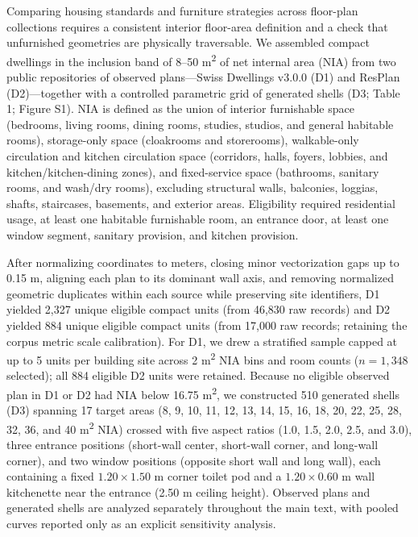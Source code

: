 \documentclass[12pt,letterpaper]{article}
\newcommand{\SubmissionCite}[1]{\unskip\citep{#1}}
\begin{document}
Comparing housing standards and furniture strategies across floor-plan collections requires a consistent interior floor-area definition and a check that unfurnished geometries are physically traversable. We assembled compact dwellings in the inclusion band of 8--50 m\textsuperscript{2} of net internal area (NIA) from two public repositories of observed plans---Swiss Dwellings v3.0.0 \SubmissionCite{standfest2022swiss} (D1) and ResPlan \SubmissionCite{abouagour2025resplan} (D2)---together with a controlled parametric grid of generated shells (D3; Table 1; Figure S1). NIA is defined as the union of interior furnishable space (bedrooms, living rooms, dining rooms, studies, studios, and general habitable rooms), storage-only space (cloakrooms and storerooms), walkable-only circulation and kitchen circulation space (corridors, halls, foyers, lobbies, and kitchen/kitchen-dining zones), and fixed-service space (bathrooms, sanitary rooms, and wash/dry rooms), excluding structural walls, balconies, loggias, shafts, staircases, basements, and exterior areas. Eligibility required residential usage, at least one habitable furnishable room, an entrance door, at least one window segment, sanitary provision, and kitchen provision.

After normalizing coordinates to meters, closing minor vectorization gaps up to 0.15 m, aligning each plan to its dominant wall axis, and removing normalized geometric duplicates within each source while preserving site identifiers, D1 yielded 2,327 unique eligible compact units (from 46,830 raw records) and D2 yielded 884 unique eligible compact units (from 17,000 raw records; retaining the corpus metric scale calibration). For D1, we drew a stratified sample capped at up to 5 units per building site across 2 m\textsuperscript{2} NIA bins and room counts (\(n = 1,348\) selected); all 884 eligible D2 units were retained. Because no eligible observed plan in D1 or D2 had NIA below 16.75 m\textsuperscript{2}, we constructed 510 generated shells (D3) spanning 17 target areas (8, 9, 10, 11, 12, 13, 14, 15, 16, 18, 20, 22, 25, 28, 32, 36, and 40 m\textsuperscript{2} NIA) crossed with five aspect ratios (1.0, 1.5, 2.0, 2.5, and 3.0), three entrance positions (short-wall center, short-wall corner, and long-wall corner), and two window positions (opposite short wall and long wall), each containing a fixed \(1.20 \times 1.50\text{ m}\) corner toilet pod and a \(1.20 \times 0.60\text{ m}\) wall kitchenette near the entrance (2.50 m ceiling height). Observed plans and generated shells are analyzed separately throughout the main text, with pooled curves reported only as an explicit sensitivity analysis.
\end{document}
